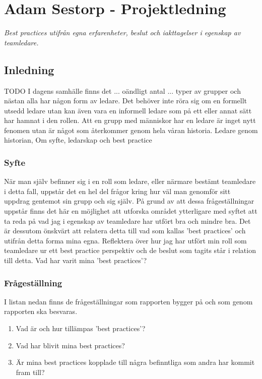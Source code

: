 \section{Adam Sestorp - Projektledning}
\emph{Best practices utifrån egna erfarenheter, beslut och iakttagelser i egenskap av teamledare.}

\subsection{Inledning}
TODO
I dagens samhälle finns det ... oändligt antal ... typer av grupper och nästan alla har någon form av ledare. Det behöver inte röra sig om en formellt utsedd ledare utan kan även vara en informell ledare som på ett eller annat sätt har hamnat i den rollen. Att en grupp med människor har en ledare är inget nytt fenomen utan är något som återkommer genom hela våran historia. 
\newline \newline
Ledare genom historian, Om syfte, ledarskap och best practice

\subsubsection{Syfte}
När man själv befinner sig i en roll som ledare, eller närmare bestämt teamledare i detta fall, uppstår det en hel del frågor kring hur väl man genomför sitt uppdrag gentemot sin grupp och sig själv. På grund av att dessa frågeställningar uppstår finns det här en möjlighet att utforska området ytterligare med syftet att ta reda på vad jag i egenskap av teamledare har utfört bra och mindre bra. Det är dessutom önskvärt att relatera detta till vad som kallas 'best practices' och utifrån detta forma mina egna.
\newline \newline
Reflektera över hur jag har utfört min roll som teamledare ur ett best practice perspektiv och de beslut som tagits står i relation till detta. Vad har varit mina 'best practices'?

\subsubsection{Frågeställning}
I listan nedan finns de frågeställningar som rapporten bygger på och som genom rapporten ska besvaras.
	\begin{enumerate}
		\item Vad är och hur tillämpas 'best practices'?
		\item Vad har blivit mina best practices?
		\item Är mina best practices kopplade till några befinntliga som andra har kommit fram till?
	\end{enumerate}
	
